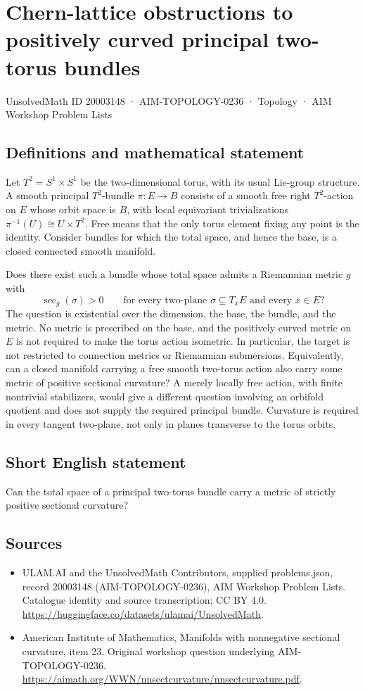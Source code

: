\documentclass[11pt,a4paper]{article}
\begin{document}
\section*{Chern-lattice obstructions to positively curved principal two-torus bundles}\label{20003148}
{\small UnsolvedMath ID 20003148 · AIM-TOPOLOGY-0236 · Topology · AIM Workshop Problem Lists}
\subsection{Definitions and mathematical statement}
Let $T^2=S^1\times S^1$ be the two-dimensional torus, with its usual Lie-group structure.
A smooth principal $T^2$-bundle $\pi:E\to B$ consists of a smooth free right $T^2$-action on $E$ whose orbit space is $B$, with local equivariant trivializations $\pi^{-1}(U)\cong U\times T^2$.
Free means that the only torus element fixing any point is the identity.
Consider bundles for which the total space, and hence the base, is a closed connected smooth manifold.

Does there exist such a bundle whose total space admits a Riemannian metric $g$ with
\[
 \sec_g(\sigma)>0
 \qquad\text{for every two-plane }\sigma\subseteq T_xE
 \text{ and every }x\in E?
\]
The question is existential over the dimension, the base, the bundle, and the metric.
No metric is prescribed on the base, and the positively curved metric on $E$ is not required to make the torus action isometric.
In particular, the target is not restricted to connection metrics or Riemannian submersions.
Equivalently, can a closed manifold carrying a free smooth two-torus action also carry some metric of positive sectional curvature?
A merely locally free action, with finite nontrivial stabilizers, would give a different question involving an orbifold quotient and does not supply the required principal bundle.
Curvature is required in every tangent two-plane, not only in planes transverse to the torus orbits.
\subsection{Short English statement}
Can the total space of a principal two-torus bundle carry a metric of strictly positive sectional curvature?
\subsection{Sources}
\begin{itemize}
\item[S1] ULAM.AI and the UnsolvedMath Contributors, supplied problems.json, record 20003148 (AIM-TOPOLOGY-0236), AIM Workshop Problem Lists. Catalogue identity and source transcription; CC BY 4.0.
\url{https://huggingface.co/datasets/ulamai/UnsolvedMath}.
\item[S2] American Institute of Mathematics, Manifolds with nonnegative sectional curvature, item 23. Original workshop question underlying AIM-TOPOLOGY-0236.
\url{https://aimath.org/WWN/nnsectcurvature/nnsectcurvature.pdf}.
\end{itemize}
\end{document}
